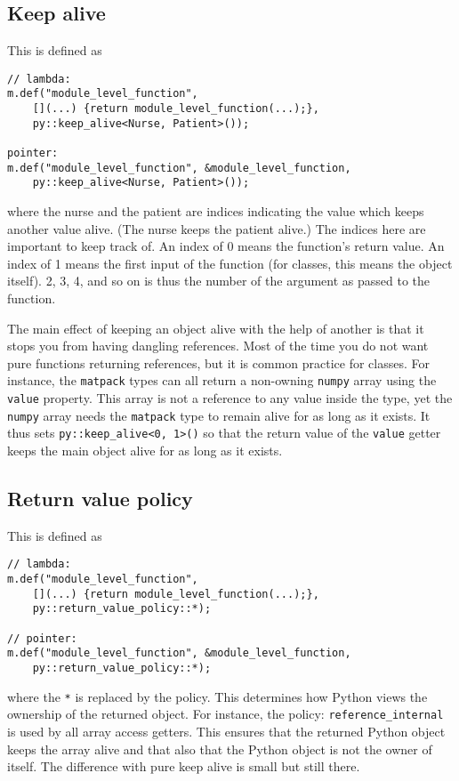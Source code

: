 \subsection{Keep alive}
This is defined as
\begin{verbatim}
// lambda:
m.def("module_level_function",
    [](...) {return module_level_function(...);},
    py::keep_alive<Nurse, Patient>());

pointer:
m.def("module_level_function", &module_level_function,
    py::keep_alive<Nurse, Patient>());
\end{verbatim}
where the nurse and the patient are indices indicating the value which keeps another value alive.  (The nurse keeps the patient alive.)
The indices here are important to keep track of.  An index of 0 means the function's return value.  An index of 1 means the first input of
the function (for classes, this means the object itself). 2, 3, 4, and so on is thus the number of the argument as passed to the function.

The main effect of keeping an object alive with the help of another is that it stops you from having dangling references.
Most of the time you do not want pure functions returning references, but it is common practice for classes.  For instance,
the \texttt{matpack} types can all return a non-owning \texttt{numpy} array using the \texttt{value} property.  This array is not
a reference to any value inside the type, yet the \texttt{numpy} array needs the \texttt{matpack} type to remain alive for as long
as it exists.  It thus sets \texttt{py::keep_alive<0, 1>()} so that the return value of the \texttt{value} getter keeps the main
object alive for as long as it exists.

\subsection{Return value policy}
This is defined as 
\begin{verbatim}
// lambda:
m.def("module_level_function",
    [](...) {return module_level_function(...);},
    py::return_value_policy::*);

// pointer:
m.def("module_level_function", &module_level_function,
    py::return_value_policy::*);
\end{verbatim}
where the \texttt{*} is replaced by the policy.  This determines how Python views the ownership of the returned object.  For instance,
the policy: \texttt{reference_internal} is used by all array access getters. This ensures that the returned Python object keeps the
array alive and that also that the Python object is not the owner of itself.  The difference with pure keep alive is small but still there.


